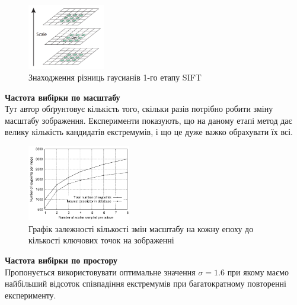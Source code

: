 \begin{enumerate}
          \begin{figure}[H]
              \centering
              \includegraphics[width=0.3\textwidth]{images/sift2}
              \caption{Знаходження різниць гаусианів 1-го етапу SIFT}
              \label{fig:swift2}
          \end{figure}

          \subitem \textbf{Частота вибірки по масштабу} \\
          Тут автор обґрунтовує кількість того, скільки разів потрібно робити
          зміну масштабу зображення. Експерименти показують, що на даному етапі метод дає
          велику кількість кандидатів екстремумів, і що це дуже важко обрахувати їх всі.
          \begin{figure}[H]
              \centering
              \includegraphics[width=0.4\textwidth]{images/sift3}
              \caption{Графік залежності кількості змін масштабу на кожну епоху до
                  кількості ключових точок на зображенні}
              \label{fig:swift3}
          \end{figure}

          \subitem \textbf{Частота вибірки по простору} \\
          Пропонується використовувати оптимальне значення $\sigma = 1.6$ при якому
          маємо найбільший відсоток співпадіння екстремумів при багатократному повторенні
          експерименту.


\end{enumerate}
